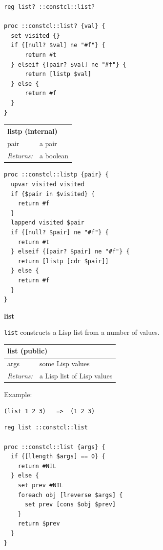 \documentclass[twoside,9pt]{report}
\begin{document}
\noindent\makebox[\linewidth]{\rule{\linewidth}{0.4pt}}
\begin{lstlisting}
reg list? ::constcl::list?
 
proc ::constcl::list? {val} {
  set visited {}
  if {[null? $val] ne "#f"} {
      return #t
  } elseif {[pair? $val] ne "#f"} {
      return [listp $val]
  } else {
      return #f
  }
}
\end{lstlisting}
\noindent\makebox[\linewidth]{\rule{\linewidth}{0.4pt}}
\begin{tabular}{ |l l| }
\hline
\multicolumn{2}{|l|}{listp (internal)} \\
\hline
pair & a pair \\
\textit{Returns:} & a boolean \\
\hline
\end{tabular}

\noindent\makebox[\linewidth]{\rule{\linewidth}{0.4pt}}
\begin{lstlisting}
proc ::constcl::listp {pair} {
  upvar visited visited
  if {$pair in $visited} {
    return #f
  }
  lappend visited $pair
  if {[null? $pair] ne "#f"} {
    return #t
  } elseif {[pair? $pair] ne "#f"} {
    return [listp [cdr $pair]]
  } else {
    return #f
  }
}
\end{lstlisting}
\noindent\makebox[\linewidth]{\rule{\linewidth}{0.4pt}}

\textbf{list}


\texttt{list} constructs a Lisp list from a number of values.

\begin{tabular}{ |l l| }
\hline
\multicolumn{2}{|l|}{list (public)} \\
\hline
args & some Lisp values \\
\textit{Returns:} & a Lisp list of Lisp values \\
\hline
\end{tabular}


Example:

\noindent\makebox[\linewidth]{\rule{\linewidth}{0.4pt}}
\begin{lstlisting}
(list 1 2 3)   =>  (1 2 3)
\end{lstlisting}
\noindent\makebox[\linewidth]{\rule{\linewidth}{0.4pt}}
\noindent\makebox[\linewidth]{\rule{\linewidth}{0.4pt}}
\begin{lstlisting}
reg list ::constcl::list
 
proc ::constcl::list {args} {
  if {[llength $args] == 0} {
    return #NIL
  } else {
    set prev #NIL
    foreach obj [lreverse $args] {
      set prev [cons $obj $prev]
    }
    return $prev
  }
}
\end{lstlisting}
\noindent\makebox[\linewidth]{\rule{\linewidth}{0.4pt}}
\end{document}
